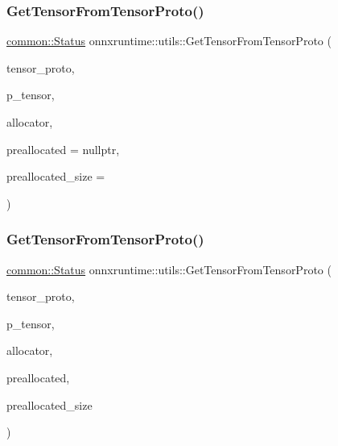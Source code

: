 \subsubsection{\texorpdfstring{Get\+Tensor\+From\+Tensor\+Proto()}{GetTensorFromTensorProto()}\hspace{0.1cm}{\footnotesize\ttfamily [1/2]}}
{\footnotesize\ttfamily \mbox{\hyperlink{classonnxruntime_1_1common_1_1Status}{common\+::\+Status}} onnxruntime\+::utils\+::\+Get\+Tensor\+From\+Tensor\+Proto (\begin{DoxyParamCaption}\item[{const O\+N\+N\+X\+\_\+\+N\+A\+M\+E\+S\+P\+A\+C\+E\+::\+Tensor\+Proto \&}]{tensor\+\_\+proto,  }\item[{std\+::unique\+\_\+ptr$<$ \mbox{\hyperlink{classonnxruntime_1_1Tensor}{Tensor}} $>$ $\ast$}]{p\+\_\+tensor,  }\item[{\mbox{\hyperlink{namespaceonnxruntime_a6cdac724c5dcefded3a63f08dae58fda}{Allocator\+Ptr}}}]{allocator,  }\item[{\mbox{\hyperlink{mlasi_8h_a88f941d423cb2a819b70a1358982b1a6}{void}} $\ast$}]{preallocated = {\ttfamily nullptr},  }\item[{\mbox{\hyperlink{mlasi_8h_a503efbc1c6e50825320ad909366b78ab}{size\+\_\+t}}}]{preallocated\+\_\+size = {} }\end{DoxyParamCaption})}

\mbox{\label{namespaceonnxruntime_1_1utils_a37c9ecf5c17ff148a413861223e1b450}} 
\subsubsection{\texorpdfstring{Get\+Tensor\+From\+Tensor\+Proto()}{GetTensorFromTensorProto()}\hspace{0.1cm}{\footnotesize\ttfamily [2/2]}}
{\footnotesize\ttfamily \mbox{\hyperlink{classonnxruntime_1_1common_1_1Status}{common\+::\+Status}} onnxruntime\+::utils\+::\+Get\+Tensor\+From\+Tensor\+Proto (\begin{DoxyParamCaption}\item[{const Tensor\+Proto \&}]{tensor\+\_\+proto,  }\item[{std\+::unique\+\_\+ptr$<$ \mbox{\hyperlink{classonnxruntime_1_1Tensor}{Tensor}} $>$ $\ast$}]{p\+\_\+tensor,  }\item[{\mbox{\hyperlink{namespaceonnxruntime_a6cdac724c5dcefded3a63f08dae58fda}{Allocator\+Ptr}}}]{allocator,  }\item[{\mbox{\hyperlink{mlasi_8h_a88f941d423cb2a819b70a1358982b1a6}{void}} $\ast$}]{preallocated,  }\item[{\mbox{\hyperlink{mlasi_8h_a503efbc1c6e50825320ad909366b78ab}{size\+\_\+t}}}]{preallocated\+\_\+size }\end{DoxyParamCaption})}

